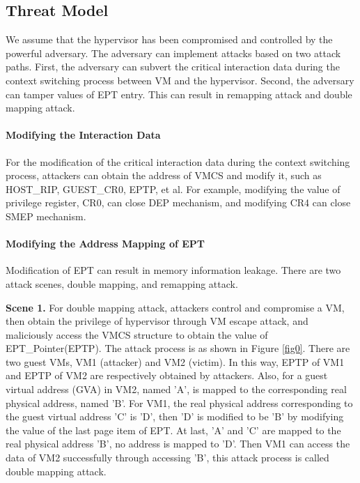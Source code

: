 \documentclass[conference]{IEEEtran}
\begin{document}
\subsection{Threat Model} \label {threat}



We assume that the hypervisor has been compromised and controlled by the powerful adversary. The adversary can implement attacks based on two attack paths. 
First, the adversary can subvert the critical interaction data during the context switching process between VM and the hypervisor. Second, the adversary can tamper values of EPT entry. This can result in remapping attack and double mapping attack.

\paragraph{Modifying the Interaction Data}
For the modification of the critical interaction data during the context switching process, attackers can obtain the address of VMCS
and modify it, such as HOST\_RIP, GUEST\_CR0, EPTP, et al. For example,
modifying the value of privilege register, CR0, can close DEP mechanism, and modifying CR4 can close SMEP mechanism.

\paragraph{Modifying the Address Mapping of EPT}
Modification of EPT can result in memory information leakage. There are two attack scenes, double mapping, and remapping attack.

\textbf{Scene 1.} 
    For double mapping attack, attackers control and compromise a VM, then obtain the privilege of hypervisor through VM escape attack, and maliciously access the VMCS structure to obtain the value of EPT\_Pointer(EPTP). The attack process is as shown in Figure \ref{fig0}. There are two guest VMs, VM1 (attacker) and VM2 (victim). In this way, EPTP of VM1 and EPTP of VM2 are respectively obtained by attackers. Also, for a guest virtual address (GVA) in VM2, named 'A', is mapped to the corresponding real physical address, named 'B'. For VM1, the real physical address corresponding to the guest virtual address 'C' is 'D', then 'D' is modified to be 'B' by modifying the value of the last page item of EPT. At last, 'A' and 'C' are mapped to the real physical address 'B', no address is mapped to 'D'. Then VM1 can access the data of VM2 successfully through accessing 'B', this attack process is called double mapping attack.
\end{document}

